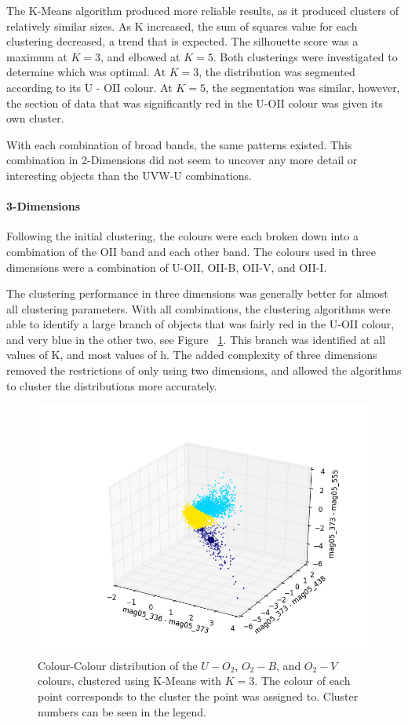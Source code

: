 The K-Means algorithm produced more reliable results, as it produced clusters of relatively similar sizes.
As K increased, the sum of squares value for each clustering decreased, a trend that is expected.
The silhouette score was a maximum at $K=3$, and elbowed at $K=5$. Both clusterings were investigated to determine which was optimal.
At $K=3$, the distribution was segmented according to its U - OII colour.
At $K=5$, the segmentation was similar, however, the section of data that was significantly red in the U-OII colour was given its own cluster.

With each combination of broad bands, the same patterns existed.
This combination in 2-Dimensions did not seem to uncover any more detail or interesting objects than the UVW-U combinations.

\paragraph{3-Dimensions}

Following the initial clustering, the colours were each broken down into a combination of the OII band and each other band.
The colours used in three dimensions were a combination of U-OII, OII-B, OII-V, and OII-I.

The clustering performance in three dimensions was generally better for almost all clustering parameters.
With all combinations, the clustering algorithms were able to identify a large branch of objects that was fairly red in the U-OII colour, and very blue in the other two, see Figure ~\ref{fig:UOIIKM3d}.
This branch was identified at all values of K, and most values of h.
The added complexity of three dimensions removed the restrictions of only using two dimensions, and allowed the algorithms to cluster the distributions more accurately.

\begin{figure}
\centering
\includegraphics[width=\linewidth]{figs/kmeans_3d_color_3cl_mag05_336-mag05_373vsmag05_373-mag05_438vsmag05_373-mag05_555}
\caption{Colour-Colour distribution of the $U-O_{2}$, $O_{2}-B$, and $O_{2}-V$ colours, clustered using K-Means with $K=3$. The colour of each point corresponds to the cluster the point was assigned to. Cluster numbers can be seen in the legend.}
\label{fig:UOIIKM3d}
\end{figure}

